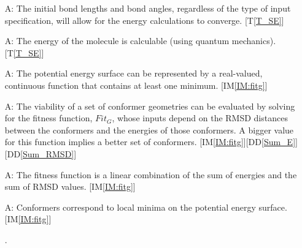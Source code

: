 \documentclass[12pt]{article}
\newcommand{\ddref}[1]{DD\ref{#1}}
\newcommand{\tref}[1]{T\ref{#1}}
\newcounter{assumpnum} %
\newcommand{\iref}[1]{IM\ref{#1}}
\begin{document}

\begin{itemize}



\item[A\refstepcounter{assumpnum}\theassumpnum \label{A:init-params-conv}:] The 
initial bond lengths and bond angles, regardless of the type of input 
specification, will allow for the energy calculations to converge. [\tref{T_SE}]

\item[A\refstepcounter{assumpnum}\theassumpnum \label{A:E-calculable}:] The 
energy of the molecule is calculable (using quantum mechanics). [\tref{T_SE}]

\item[A\refstepcounter{assumpnum}\theassumpnum \label{A:one-min}:] The 
potential energy surface can be represented by a real-valued, continuous 
function that contains at least one minimum. [\iref{IM:fitg}]

\item[A\refstepcounter{assumpnum}\theassumpnum \label{A:emp-func}:] The 
viability of a set of conformer geometries can be evaluated by solving for the 
fitness function, $Fit_G$, whose inputs depend on the RMSD distances between 
the conformers and the energies of those conformers. A bigger value for this 
function implies a better set of conformers. 
[\iref{IM:fitg}][\ddref{Sum_E}][\ddref{Sum_RMSD}]

\item[A\refstepcounter{assumpnum}\theassumpnum \label{A:linear-fit}:] The 
fitness function is a linear combination of the sum of energies and the sum of 
RMSD values. [\iref{IM:fitg}]

\item[A\refstepcounter{assumpnum}\theassumpnum \label{A:conf=min}:] Conformers 
correspond to local minima on the potential energy surface. [\iref{IM:fitg}]

.


\end{itemize}
\end{document}
